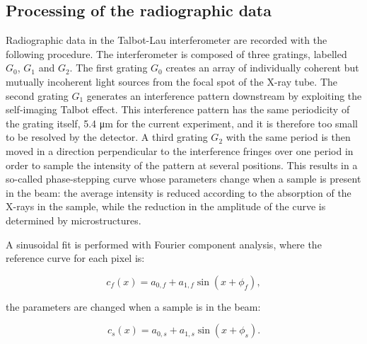 \subsection{Processing of the radiographic data}\label{sec:radioprocessing}
Radiographic data in the Talbot-Lau interferometer are recorded with the
following procedure. The interferometer is composed of three gratings,
labelled $G_0$, $G_1$ and $G_2$. The first grating $G_0$ creates an array of
individually coherent but mutually incoherent light sources from the
focal spot of the X-ray tube. The second grating $G_1$ generates an
interference pattern downstream by exploiting the self-imaging Talbot
effect. This interference pattern has the same periodicity of the grating
itself, 5.4 μm for the current experiment, and it is therefore too small to
be resolved by the detector. A third grating $G_2$ with the same period is
then moved in a direction perpendicular to the interference fringes over one
period in order to sample the intensity of the pattern at several positions.
This results in a so-called phase-stepping curve whose parameters change
when a sample is present in the beam: the average intensity is reduced
according to the absorption of the X-rays in the sample, while the reduction
in the amplitude of the curve is determined by microstructures.

A sinusoidal fit is performed with Fourier component analysis, where the
reference curve for each pixel is:

\begin{equation}
    c_f(x) = a_{0,f} + a_{1,f} \sin(x + \phi_{f}),
    \label{eqn:flat}
\end{equation}

the parameters are changed when a sample is in the beam:

\begin{equation}
    c_s(x) = a_{0,s} + a_{1,s} \sin(x + \phi_{s}).
    \label{eqn:sample}
\end{equation}

